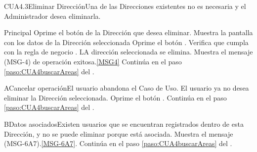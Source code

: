 	\begin{UseCase}{CUA4.3}{Eliminar Dirección}{Una de las Direcciones existentes no es necesaria y el Administrador desea eliminarla.}
	\end{UseCase}

	\begin{UCtrayectoria}{Principal}
			\UCpaso[\UCactor] Oprime el botón  de la Dirección que desea eliminar.
			\UCpaso Muestra la pantalla  con los datos de la Dirección seleccionada  
			\UCpaso [\UCactor] Oprime el botón .
			\UCpaso Verifica que cumpla con la regla de negocio .  
			\UCpaso LA dirección seleccionada se elimina.
			\UCpaso Muestra el mensaje (MSG-4) de operación exitosa.\ref{MSG4}
			\UCpaso Continúa en el paso \ref{paso:CUA4buscarAreas} del .
	\end{UCtrayectoria}

		\begin{UCtrayectoriaA}{A}{Cancelar operación}{El usuario abandona el Caso de Uso.}
			\UCpaso[\UCactor] El usuario ya no desea eliminar la Dirección seleccionada.
			\UCpaso[\UCactor] Oprime el botón .
			\UCpaso Continúa en el paso \ref{paso:CUA4buscarAreas} del .
		\end{UCtrayectoriaA}

		 \begin{UCtrayectoriaA}{B}{Datos asociados}{Existen usuarios que se encuentran registrados dentro de esta Dirección, y no se puede eliminar porque está asociada.}
			\UCpaso Muestra el mensaje (MSG-6A7).\ref{MSG-6A7}.
			\UCpaso Continúa en el paso \ref{paso:CUA4buscarAreas} del .
		\end{UCtrayectoriaA}

